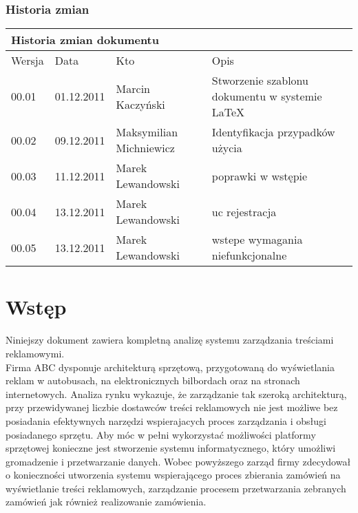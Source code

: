 \documentclass[10pt,a4paper,titlepage]{article} %
\begin{document}
	\subsubsection*{Historia zmian}
		\begin{table}[h]
		\begin{tabular}{|m{1cm}|m{2cm}|m{3.5cm}|m{6.5cm}|}
			\hline
			\multicolumn{4}{|l|}{Historia zmian dokumentu} \\
			\hline
			\hline Wersja  & Data & Kto & Opis  \\ 
			\hline 00.01 & 01.12.2011 & Marcin Kaczyński & Stworzenie szablonu dokumentu w systemie \LaTeX \\ 
			\hline 00.02 & 09.12.2011 & Maksymilian Michniewicz & Identyfikacja przypadków użycia \\ 
			\hline 00.03 & 11.12.2011 & Marek Lewandowski & poprawki w wstępie \\ 
			\hline 00.04 & 13.12.2011 & Marek Lewandowski & uc rejestracja \\ 
			\hline 00.05 & 13.12.2011 & Marek Lewandowski & wstepe wymagania
			niefunkcjonalne
			\\
			\hline 
		\end{tabular} 
		\end{table}
	\newpage

	
	\tableofcontents
	\newpage
	

	\section{Wstęp}

		Niniejszy dokument zawiera kompletną analizę systemu zarządzania treściami
		reklamowymi.\\ 
		
		Firma ABC dysponuje architekturą sprzętową, przygotowaną do wyświetlania
		reklam w autobusach, na elektronicznych bilbordach oraz na stronach
		internetowych. Analiza rynku wykazuje, że zarządzanie tak szeroką architekturą,
		przy przewidywanej liczbie dostawców treści reklamowych nie jest możliwe
		bez posiadania efektywnych narzędzi wspierajacych proces zarządzania i obsługi
		posiadanego sprzętu. Aby móc w pełni wykorzystać możliwości platformy sprzętowej
		konieczne jest stworzenie systemu informatycznego, który umożliwi gromadzenie i 
		przetwarzanie danych. Wobec powyższego zarząd firmy zdecydował o konieczności
		utworzenia systemu wspierającego proces zbierania zamówień na wyświetlanie
		treści reklamowych, zarządzanie procesem przetwarzania zebranych zamówień jak 
		również realizowanie zamówienia.\\
		
\end{document}
